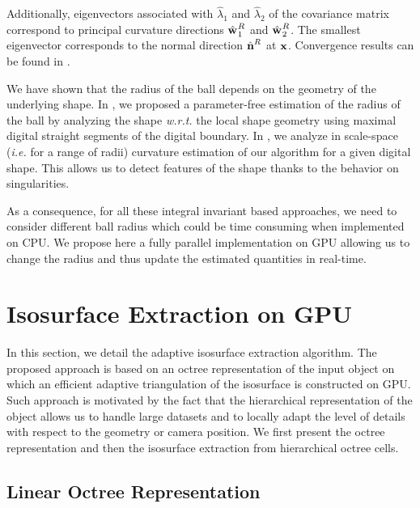 \documentclass{llncs}
\newcommand{\ie}{\emph{i.e.} }
\newcommand{\wrt}{\emph{w.r.t.} }
\begin{document}
Additionally, eigenvectors associated with $\hat{\lambda}_1$ and
$\hat{\lambda}_2$ of the covariance matrix correspond to principal curvature
directions $\hat{\mathbf{w}_{}}_{1}^{R}$ and $\hat{\mathbf{w}_{}}_{2}^{R}$. The smallest eigenvector
corresponds to the normal direction $\hat{\mathbf{n}{}}^{R}$ at $\mathbf{x}$. Convergence
results can be found in \cite{ChapterIICurvature}.

We have shown that the radius of the ball depends on the geometry of
the underlying shape. In \cite{DGCI2014}, we proposed a parameter-free
estimation of the radius of the ball by analyzing the shape \wrt the
local shape geometry using maximal digital straight segments of the
digital boundary. In \cite{SMI2015}, we analyze in scale-space (\ie
for a range of radii) curvature estimation of our algorithm for a
given digital shape. This allows us to detect features of the shape
thanks to the behavior on singularities.

As a consequence, for all these integral invariant based approaches,
we need to consider different ball radius which could be time
consuming when implemented on CPU. We propose here a fully parallel
implementation on GPU allowing us to change the radius and thus update
the estimated quantities in real-time.

\section{Isosurface Extraction on GPU}
\label{sec:isos-extr-gpu}

In this section, we detail the adaptive isosurface extraction
algorithm. The proposed approach is based on an octree representation
of the input object on which an efficient adaptive triangulation
of the isosurface is constructed on GPU. Such approach is motivated by
the fact that the hierarchical representation of the object allows us
to handle large datasets and to locally adapt the level of details
with respect to the geometry or camera position. We first present the
octree representation and then the isosurface extraction from
hierarchical octree cells.

\subsection{Linear Octree Representation}
\end{document}
